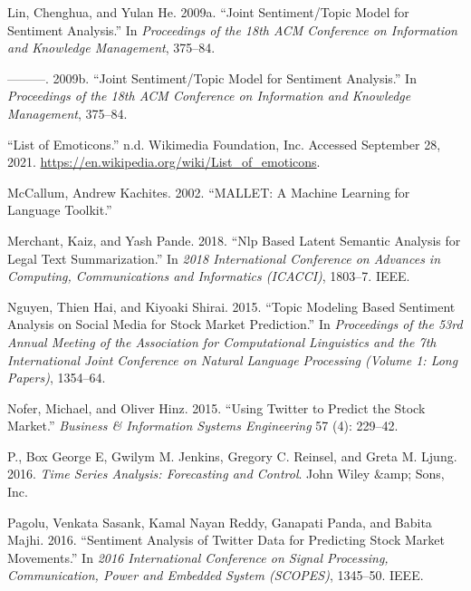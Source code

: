 \documentclass[
]{article}
\newlength{\cslhangindent}
\newlength{\cslentryspacingunit} %
\newenvironment{CSLReferences}[2] %
 {%
  \setlength{\parindent}{0pt}
  \ifodd #1
  \let\oldpar\par
  \def\par{\hangindent=\cslhangindent\oldpar}
  \fi
  \setlength{\parskip}{#2\cslentryspacingunit}
 }%
 {}
\begin{document}
\begin{CSLReferences}{1}{0}
\leavevmode{}%
Lin, Chenghua, and Yulan He. 2009a. {``Joint Sentiment/Topic Model for
Sentiment Analysis.''} In \emph{Proceedings of the 18th ACM Conference
on Information and Knowledge Management}, 375--84.

\leavevmode{}%
---------. 2009b. {``Joint Sentiment/Topic Model for Sentiment
Analysis.''} In \emph{Proceedings of the 18th ACM Conference on
Information and Knowledge Management}, 375--84.

\leavevmode{}%
{``List of Emoticons.''} n.d. Wikimedia Foundation, Inc. Accessed
September 28, 2021.
\url{https://en.wikipedia.org/wiki/List_of_emoticons}.

\leavevmode{}%
McCallum, Andrew Kachites. 2002. {``MALLET: A Machine Learning for
Language Toolkit.''}

\leavevmode{}%
Merchant, Kaiz, and Yash Pande. 2018. {``Nlp Based Latent Semantic
Analysis for Legal Text Summarization.''} In \emph{2018 International
Conference on Advances in Computing, Communications and Informatics
(ICACCI)}, 1803--7. IEEE.

\leavevmode{}%
Nguyen, Thien Hai, and Kiyoaki Shirai. 2015. {``Topic Modeling Based
Sentiment Analysis on Social Media for Stock Market Prediction.''} In
\emph{Proceedings of the 53rd Annual Meeting of the Association for
Computational Linguistics and the 7th International Joint Conference on
Natural Language Processing (Volume 1: Long Papers)}, 1354--64.

\leavevmode{}%
Nofer, Michael, and Oliver Hinz. 2015. {``Using Twitter to Predict the
Stock Market.''} \emph{Business \& Information Systems Engineering} 57
(4): 229--42.

\leavevmode{}%
P., Box George E, Gwilym M. Jenkins, Gregory C. Reinsel, and Greta M.
Ljung. 2016. \emph{Time Series Analysis: Forecasting and Control}. John
Wiley \&amp; Sons, Inc.

\leavevmode{}%
Pagolu, Venkata Sasank, Kamal Nayan Reddy, Ganapati Panda, and Babita
Majhi. 2016. {``Sentiment Analysis of Twitter Data for Predicting Stock
Market Movements.''} In \emph{2016 International Conference on Signal
Processing, Communication, Power and Embedded System (SCOPES)},
1345--50. IEEE.


\end{CSLReferences}
\end{document}
